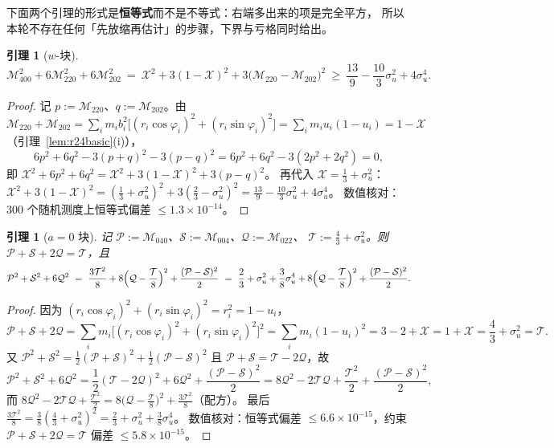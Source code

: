 \documentclass[UTF8,11pt]{ctexart}
\newtheorem{lemma}[theorem]{引理}
\theoremstyle{definition}
\begin{document}
下面两个引理的形式是\textbf{恒等式}而不是不等式：右端多出来的项是完全平方，
所以本轮不存在任何「先放缩再估计」的步骤，下界与亏格同时给出。

\begin{lemma}[$w$-块]\label{lem:r24wblock}
\[
\mathcal{M}_{400}^2+6\mathcal{M}_{220}^2+6\mathcal{M}_{202}^2
\ =\ \mathcal{X}^2+3(1-\mathcal{X})^2+3\bigl(\mathcal{M}_{220}-\mathcal{M}_{202}\bigr)^2
\ \ge\ \frac{13}9-\frac{10}3\sigma_u^2+4\sigma_u^4 .
\]
\end{lemma}

\begin{proof}
记 $p:=\mathcal{M}_{220}$、$q:=\mathcal{M}_{202}$。由
$\mathcal{M}_{220}+\mathcal{M}_{202}=\sum_im_ib_i^2\bigl[(r_i\cos\varphi_i)^2+(r_i\sin\varphi_i)^2\bigr]
=\sum_im_iu_i(1-u_i)=1-\mathcal{X}$（引理~\ref{lem:r24basic}(i)），
\[
6p^2+6q^2-3(p+q)^2-3(p-q)^2=6p^2+6q^2-3(2p^2+2q^2)=0 ,
\]
即 $\mathcal{X}^2+6p^2+6q^2=\mathcal{X}^2+3(1-\mathcal{X})^2+3(p-q)^2$。
再代入 $\mathcal{X}=\frac13+\sigma_u^2$：
$\mathcal{X}^2+3(1-\mathcal{X})^2=(\frac13+\sigma_u^2)^2+3(\frac23-\sigma_u^2)^2
=\frac{13}9-\frac{10}3\sigma_u^2+4\sigma_u^4$。
数值核对：$300$ 个随机测度上恒等式偏差 $\le1.3\times10^{-14}$。
\end{proof}

\begin{lemma}[$a{=}0$ 块]\label{lem:r24a0block}
记 $\mathcal{P}:=\mathcal{M}_{040}$、$\mathcal{S}:=\mathcal{M}_{004}$、$\mathcal{Q}:=\mathcal{M}_{022}$、
$\mathcal{T}:=\frac43+\sigma_u^2$。则 $\mathcal{P}+\mathcal{S}+2\mathcal{Q}=\mathcal{T}$，且
\[
\mathcal{P}^2+\mathcal{S}^2+6\mathcal{Q}^2
\ =\ \frac{3\mathcal{T}^2}8+8\Bigl(\mathcal{Q}-\frac{\mathcal{T}}8\Bigr)^2+\frac{(\mathcal{P}-\mathcal{S})^2}2
\ =\ \frac23+\sigma_u^2+\frac38\sigma_u^4+8\Bigl(\mathcal{Q}-\frac{\mathcal{T}}8\Bigr)^2+\frac{(\mathcal{P}-\mathcal{S})^2}2 .
\]
\end{lemma}

\begin{proof}
因为 $(r_i\cos\varphi_i)^2+(r_i\sin\varphi_i)^2=r_i^2=1-u_i$，
\[
\mathcal{P}+\mathcal{S}+2\mathcal{Q}=\sum_im_i\bigl[(r_i\cos\varphi_i)^2+(r_i\sin\varphi_i)^2\bigr]^2
=\sum_im_i(1-u_i)^2=3-2+\mathcal{X}=1+\mathcal{X}=\frac43+\sigma_u^2=\mathcal{T}.
\]
又 $\mathcal{P}^2+\mathcal{S}^2=\frac12(\mathcal{P}+\mathcal{S})^2+\frac12(\mathcal{P}-\mathcal{S})^2$
且 $\mathcal{P}+\mathcal{S}=\mathcal{T}-2\mathcal{Q}$，故
\[
\mathcal{P}^2+\mathcal{S}^2+6\mathcal{Q}^2
=\frac12(\mathcal{T}-2\mathcal{Q})^2+6\mathcal{Q}^2+\frac{(\mathcal{P}-\mathcal{S})^2}2
=8\mathcal{Q}^2-2\mathcal{T}\mathcal{Q}+\frac{\mathcal{T}^2}2+\frac{(\mathcal{P}-\mathcal{S})^2}2 ,
\]
而 $8\mathcal{Q}^2-2\mathcal{T}\mathcal{Q}+\frac{\mathcal{T}^2}2
=8\bigl(\mathcal{Q}-\frac{\mathcal{T}}8\bigr)^2+\frac{3\mathcal{T}^2}8$（配方）。
最后 $\frac{3\mathcal{T}^2}8=\frac38(\frac43+\sigma_u^2)^2=\frac23+\sigma_u^2+\frac38\sigma_u^4$。
数值核对：恒等式偏差 $\le6.6\times10^{-15}$，约束 $\mathcal{P}+\mathcal{S}+2\mathcal{Q}=\mathcal{T}$ 偏差 $\le5.8\times10^{-15}$。
\end{proof}
\end{document}
